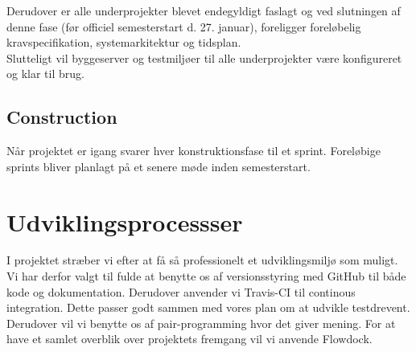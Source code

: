 Derudover er alle underprojekter blevet endegyldigt faslagt og ved slutningen af denne fase (før officiel semesterstart d. 27. januar), foreligger foreløbelig kravspecifikation, systemarkitektur og tidsplan. \\

Slutteligt vil byggeserver og testmiljøer til alle underprojekter være konfigureret og klar til brug.

\subsection{Construction}
Når projektet er igang svarer hver konstruktionsfase til et sprint. Foreløbige sprints bliver planlagt på et senere møde inden semesterstart.

\section{Udviklingsprocessser}
I projektet stræber vi efter at få så professionelt et udviklingsmiljø som muligt. Vi har derfor valgt til fulde at benytte os af versionsstyring med GitHub til både kode og dokumentation. Derudover anvender vi Travis-CI til continous integration. Dette passer godt sammen med vores plan om at udvikle testdrevent.
Derudover vil vi benytte os af pair-programming hvor det giver mening.
For at have et samlet overblik over projektets fremgang vil vi anvende Flowdock.